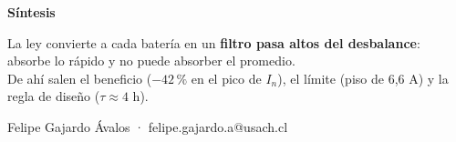 \documentclass[aspectratio=169,11pt]{beamer}
\begin{document}
\begin{frame}[plain]
  \centering\vfill
  {\Large\color{usachA}\textbf{Síntesis}}\\[10pt]
  \begin{minipage}{.82\textwidth}\centering
    La ley convierte a cada batería en un \textbf{filtro pasa altos del desbalance}: absorbe lo rápido y no puede absorber el promedio.\\[6pt]
    De ahí salen el \alert{beneficio} ($-42\,\%$ en el pico de $I_n$), el \alert{límite} (piso de 6{,}6 A) y la \alert{regla de diseño} ($\tau\approx4$ h).
  \end{minipage}
  \vfill
  {\small Felipe Gajardo Ávalos · felipe.gajardo.a@usach.cl}
  \vfill
\end{frame}
\end{document}
